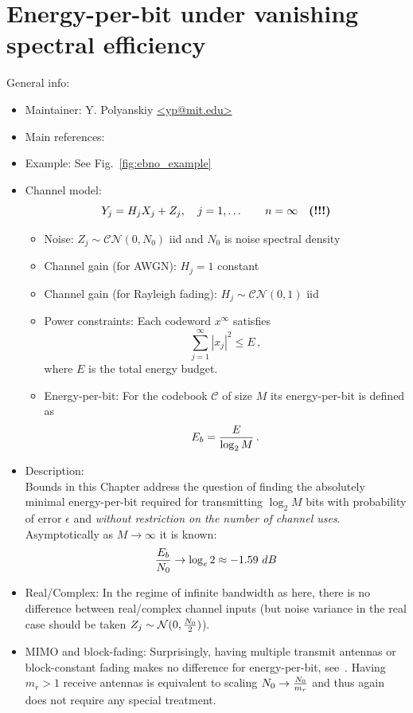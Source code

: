 \documentclass[a4paper,11p]{memoir}
\def\matn{\mathcal{N}}
\def\matcn{\mathcal{CN}}
\def\matc{\mathcal{C}}
\begin{document}
\chapter{Energy-per-bit under vanishing spectral efficiency}

General info:
\begin{itemize}
\item Maintainer: Y. Polyanskiy \url{<yp@mit.edu>}

\item Main references: \cite{PPV10eneff,YDP15}

\item Example: See Fig.~\ref{fig:ebno_example} 

\item Channel model:
\begin{equation}\label{eq:ebno_channel}
		Y_j = H_j X_j + Z_j, \quad j=1,\ldots \qquad n=\infty \quad\mbox{\bfseries (!!!)} 
\end{equation}	
	\begin{itemize}
	\item Noise: $Z_j \sim \matcn(0,N_0)$ iid and $N_0$ is noise spectral density
	\item Channel gain (for AWGN): $H_j=1$ constant
	\item Channel gain (for Rayleigh fading): $H_j\sim\matcn(0,1)$ iid 
	\item Power constraints: Each codeword $x^\infty$ satisfies
			$$ \sum_{j=1}^\infty |x_j|^2 \le E\,,  $$
		where $E$ is the total energy budget. 
	\item Energy-per-bit: For the codebook $\matc$ of size $M$ its energy-per-bit is defined as
			$$ E_b = {E\over \log_2 M}\,.$$
	\end{itemize}

\item Description: \\Bounds in this Chapter address the question of finding the absolutely minimal energy-per-bit required
for transmitting $\log_2 M$ bits with probability of error $\epsilon$ and \textit{without
restriction on the number of channel uses}. Asymptotically as $M\to \infty$ it is known:
	$$ {E_b\over N_0} \to \log_e 2 \approx -1.59~dB $$

\item Real/Complex: In the regime of infinite bandwidth as here, there is no difference between real/complex channel
inputs (but noise variance in the real case should be taken $Z_j \sim \matn(0, {N_0\over 2})$).

\item MIMO and block-fading: Surprisingly, having multiple transmit antennas or block-constant fading makes no 
	difference for energy-per-bit, see~\cite{YDP15}. Having $m_r>1$ receive antennas is equivalent to scaling $N_0
	\to {N_0\over m_r}$ and thus again does not require any special treatment.


\end{itemize}
\end{document}
